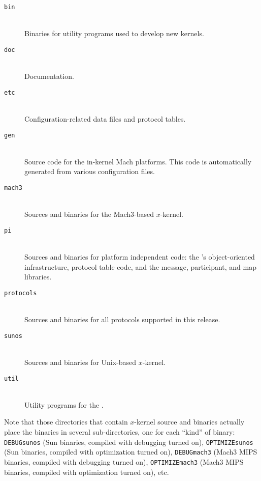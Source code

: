 \begin{description}

\item[{\tt bin}]~\\ Binaries for utility programs used to develop new
kernels.

\item[{\tt doc}]~\\ Documentation.

\item[{\tt etc}]~\\ Configuration-related data files and protocol
tables. 

\item[{\tt gen}]~\\ Source code for the in-kernel Mach platforms.
This code is automatically generated from various configuration files. 

\item[{\tt mach3}]~\\ Sources and binaries for the Mach3-based $x$-kernel.

\item[{\tt pi}]~\\ Sources and binaries for platform independent code:
the \xk{}'s object-oriented infrastructure, protocol table code, and
the message, participant, and map libraries.

\item[{\tt protocols}]~\\ Sources and binaries for all protocols supported 
in this release.

\item[{\tt sunos}]~\\ Sources and binaries for Unix-based $x$-kernel.

\item[{\tt util}]~\\ Utility programs for the \xk{}.


\end{description}

\noindent Note that those directories that contain $x$-kernel source
and binaries actually place the binaries in several sub-directories,
one for each ``kind'' of binary: {\tt DEBUGsunos} (Sun binaries,
compiled with debugging turned on), {\tt OPTIMIZEsunos} (Sun binaries,
compiled with optimization turned on), {\tt DEBUGmach3} (Mach3 MIPS
binaries, compiled with debugging turned on), {\tt OPTIMIZEmach3}
(Mach3 MIPS binaries, compiled with optimization turned on), etc.


